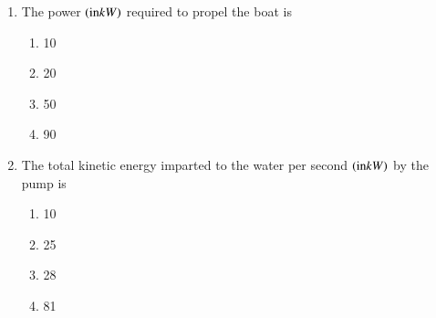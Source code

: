 \documentclass[journal]{IEEEtran}
\begin{document}
\begin{enumerate}[start=19]
\item The power $\left(\text{in} kW\right)$ required to propel the boat is
\begin{enumerate}
    \item 10
    \item 20
    \item 50
    \item 90
\end{enumerate}
\item The total kinetic energy imparted to the water per second $\left(\text{in} kW\right)$ by the pump is
\begin{enumerate}
    \item 10
    \item 25
    \item 28
    \item 81
\end{enumerate}

\end{enumerate}
\end{document}
